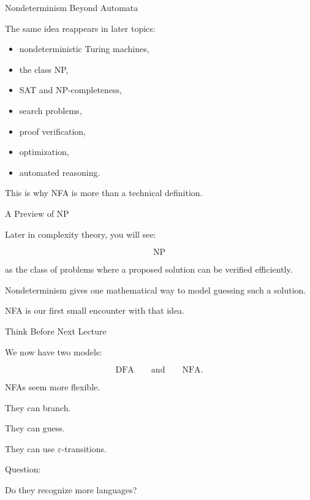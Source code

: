 \documentclass[10pt,aspectratio=169]{beamer}
\newcommand{\eps}{\varepsilon}
\begin{document}
\begin{frame}{Nondeterminism Beyond Automata}

The same idea reappears in later topics:

\begin{itemize}
\item nondeterministic Turing machines,
\item the class NP,
\item SAT and NP-completeness,
\item search problems,
\item proof verification,
\item optimization,
\item automated reasoning.
\end{itemize}

\vspace{1em}

This is why NFA is more than a technical definition.

\end{frame}

\begin{frame}{A Preview of NP}

Later in complexity theory, you will see:

\[
\text{NP}
\]

as the class of problems where a proposed solution can be verified efficiently.

\vspace{1em}

Nondeterminism gives one mathematical way to model guessing such a solution.

\vspace{1em}

NFA is our first small encounter with that idea.

\end{frame}

\begin{frame}{Think Before Next Lecture}

We now have two models:

\[
\text{DFA}
\qquad
\text{and}
\qquad
\text{NFA}.
\]

\vspace{1em}

NFAs seem more flexible.

They can branch.

They can guess.

They can use \(\eps\)-transitions.

\vspace{1em}

Question:

\begin{center}
Do they recognize more languages?
\end{center}

\end{frame}
\end{document}

